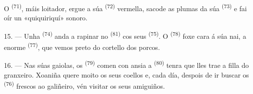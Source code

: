 O  \textsuperscript{(71)}, máis loitador, ergue a súa 
\textsuperscript{(72)} vermella, sacode as plumas da súa  \textsuperscript{(73)}
e fai oír un «quiquiriquí» sonoro.

15. --- Unha  \textsuperscript{(74)} anda a rapinar no
 \textsuperscript{(81)} cos seus 
\textsuperscript{(75)}. O  \textsuperscript{(78)} foxe cara á súa nai, a enorme
 \textsuperscript{(77)}, que vemos preto do cortello dos porcos.

16. --- Nas súas gaiolas, os  \textsuperscript{(79)} comen con ansia a
 \textsuperscript{(80)} tenra que lles trae a filla do granxeiro.
Xoaniña quere moito os seus coellos e, cada día, despois de ir buscar os
 \textsuperscript{(76)} frescos ao galiñeiro, vén visitar os seus
amiguiños.
\VUsaut{6.0mm}
\VUfilet{22mm}
